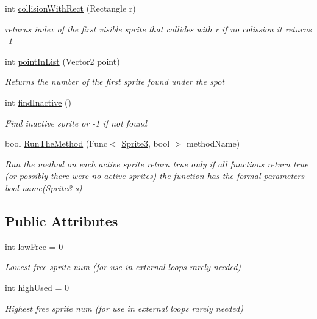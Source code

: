 \begin{DoxyCompactItemize}
int \mbox{\hyperlink{class_r_c___framework_1_1_sprite_list_ac5d904b4fb5a97aadefde7838aea186c}{collision\+With\+Rect}} (Rectangle r)
\begin{DoxyCompactList}\small\item\em returns index of the first visible sprite that collides with r if no colission it returns -\/1 \end{DoxyCompactList}\item 
int \mbox{\hyperlink{class_r_c___framework_1_1_sprite_list_a06ea4d7accd25d0fb593bcf043bb16b5}{point\+In\+List}} (Vector2 point)
\begin{DoxyCompactList}\small\item\em Returns the number of the first sprite found \textquotesingle{}under\textquotesingle{} the spot \end{DoxyCompactList}\item 
int \mbox{\hyperlink{class_r_c___framework_1_1_sprite_list_a737c9d5cc39dbb8c3754b2fd6d67e8ab}{find\+Inactive}} ()
\begin{DoxyCompactList}\small\item\em Find inactive sprite or -\/1 if not found \end{DoxyCompactList}\item 
bool \mbox{\hyperlink{class_r_c___framework_1_1_sprite_list_ad3406b2aeba1b08f23f13a35454f63e3}{Run\+The\+Method}} (Func$<$ \mbox{\hyperlink{class_r_c___framework_1_1_sprite3}{Sprite3}}, bool $>$ method\+Name)
\begin{DoxyCompactList}\small\item\em Run the method on each active sprite return true only if all functions return true (or possibly there were no active sprites) the function has the formal parameters bool name(\+Sprite3 s) \end{DoxyCompactList}\end{DoxyCompactItemize}
\subsection*{Public Attributes}
\begin{DoxyCompactItemize}
\item 
int \mbox{\hyperlink{class_r_c___framework_1_1_sprite_list_ac5f0c7b4e89b70c3ca6d87c45d874ad9}{low\+Free}} = 0
\begin{DoxyCompactList}\small\item\em Lowest free sprite num (for use in external loops rarely needed) \end{DoxyCompactList}\item 
int \mbox{\hyperlink{class_r_c___framework_1_1_sprite_list_acba70858abae8afe358df8fe61c8c394}{high\+Used}} = 0
\begin{DoxyCompactList}\small\item\em Highest free sprite num (for use in external loops rarely needed) \end{DoxyCompactList}\end{DoxyCompactItemize}
